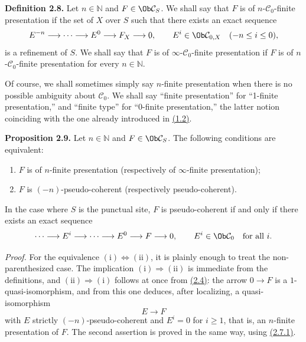 \textbf{Definition 2.8.} Let \(n\in\mathbb N\) and \(F\in\Ob\mathcal C_S\). We shall say that \(F\) is of \(n\)-\(\mathcal C_0\)-finite presentation if the set of \(X\) over \(S\) such that there exists an exact sequence
\[
  E^{-n}\longrightarrow\cdots\longrightarrow E^0\longrightarrow F_X\longrightarrow 0,
\qquad E^i\in\Ob\mathcal C_{0,X}\quad(-n\leq i\leq 0),
\]
is a refinement of \(S\). We shall say that \(F\) is of \(\infty\)-\(\mathcal C_0\)-finite presentation if \(F\) is of \(n\)-\(\mathcal C_0\)-finite presentation for every \(n\in\mathbb N\).

Of course, we shall sometimes simply say \(n\)-finite presentation when there is no possible ambiguity about \(\mathcal C_0\). We shall say ``finite presentation'' for ``1-finite presentation,'' and ``finite type'' for ``0-finite presentation,'' the latter notion coinciding with the one already introduced in \hyperlink{sga6.e01.sec.1.2}{(1.2)}.

\textbf{Proposition 2.9.} Let \(n\in\mathbb N\) and \(F\in\Ob\mathcal C_S\). The following conditions are equivalent:
\begin{enumerate}[label=(\roman*)]
\item \(F\) is of \(n\)-finite presentation (respectively of \(\infty\)-finite presentation);
\item \(F\) is \((-n)\)-pseudo-coherent (respectively pseudo-coherent).
\end{enumerate}
In the case where \(S\) is the punctual site, \(F\) is pseudo-coherent if and only if there exists an exact sequence
\[
  \cdots\longrightarrow E^i\longrightarrow\cdots\longrightarrow E^0\longrightarrow F\longrightarrow 0,
\qquad E^i\in\Ob\mathcal C_0\quad\text{for all }i.
\]

\emph{Proof.} For the equivalence \((\mathrm{i})\Leftrightarrow(\mathrm{ii})\), it is plainly enough to treat the non-parenthesized case. The implication \((\mathrm{i})\Rightarrow(\mathrm{ii})\) is immediate from the definitions, and \((\mathrm{ii})\Rightarrow(\mathrm{i})\) follows at once from \hyperlink{sga6.e01.prop.2-4}{(2.4)}: the arrow \(0\to F\) is a \(1\)-quasi-isomorphism, and from this one deduces, after localizing, a quasi-isomorphism
\[
  E\longrightarrow F
\]
with \(E\) strictly \((-n)\)-pseudo-coherent and \(E^i=0\) for \(i\geq 1\), that is, an \(n\)-finite presentation of \(F\). The second assertion is proved in the same way, using \hyperlink{sga6.e01.prop.2-7-1}{(2.7.1)}.


